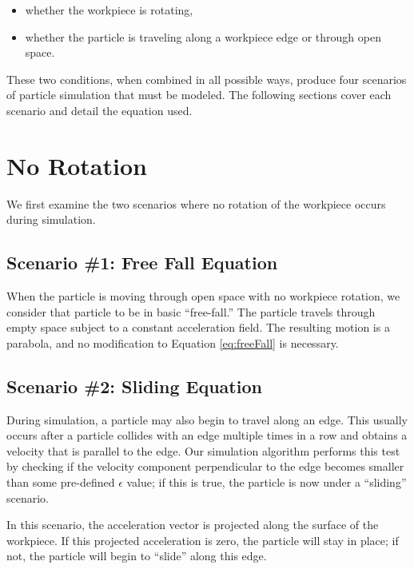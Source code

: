 \begin{itemize}
	\item whether the workpiece is rotating,
	\item whether the particle is traveling along a workpiece edge or through open space.
\end{itemize}

These two conditions, when combined in all possible ways, produce four scenarios of particle simulation that must be modeled. The following sections cover each scenario and detail the equation used.


\section{No Rotation}

We first examine the two scenarios where no rotation of the workpiece occurs during simulation.

		\subsection{Scenario \#1: Free Fall Equation}

When the particle is moving through open space with no workpiece rotation, we consider that particle to be in basic ``free-fall.'' The particle travels through empty space subject to a constant acceleration field. The resulting motion is a parabola, and no modification to Equation \eqref{eq:freeFall} is necessary.


		\subsection{Scenario \#2: Sliding Equation}

During simulation, a particle may also begin to travel along an edge. This usually occurs after a particle collides with an edge multiple times in a row and obtains a velocity that is parallel to the edge. Our simulation algorithm performs this test by checking if the velocity component perpendicular to the edge becomes smaller than some pre-defined $\epsilon$ value; if this is true, the particle is now under a ``sliding'' scenario.

In this scenario, the acceleration vector is projected along the surface of the workpiece. If this projected acceleration is zero, the particle will stay in place; if not, the particle will begin to ``slide'' along this edge.

